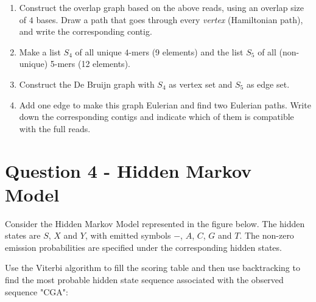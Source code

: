 \documentclass[a4paper,11pt]{article}
\begin{document}
\begin{enumerate}
\item Construct the overlap graph based on the above reads, using an
  overlap size of $4$ bases.
  Draw a path that goes
  through every \emph{vertex} (Hamiltonian path), and write the
  corresponding contig. 
\item Make a list $S_4$ of all unique $4$-mers (9 elements) and the
  list $S_5$ of all (non-unique) 5-mers (12 elements). 
\item Construct the De Bruijn graph with $S_4$ as vertex set and
  $S_5$ as edge set.
\item Add one edge to make this graph Eulerian and find two Eulerian paths.
  Write down the corresponding contigs and indicate which of them is
  compatible with the full reads.
\end{enumerate}


\section*{Question 4 - Hidden Markov Model}

Consider the Hidden Markov Model represented in the figure below. The
hidden states are $S$, $X$ and $Y$, with emitted symbols 
$-$, $A$, $C$, $G$ and $T$. The non-zero emission probabilities are
specified under the
corresponding hidden states. 



Use the Viterbi algorithm to fill the scoring table and then use
backtracking to find the most probable hidden state sequence
associated with the observed sequence "CGA": 
\end{document}
